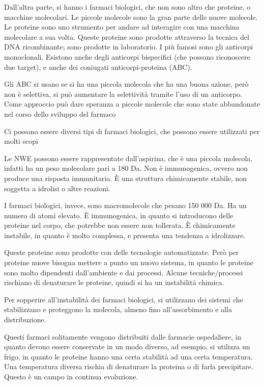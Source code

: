 Dall'altra parte, si hanno i farmaci biologici, che non sono altro che
proteine, o macchine molecolari. Le piccole molecole sono la gran parte
delle nuove molecole. Le proteine sono uno strumento per andare ad
interagire con una macchina molecolare a sua volta.
Queste proteine sono prodotte attraverso la tecnica del DNA
ricombinante; sono prodotte in laboratorio.
I più famosi sono gli anticorpi monoclonali. Esistono anche degli
anticorpi bispecifici (che possono riconoscere due target), e anche dei
coniugati anticorpi-proteina (ABC).

Gli ABC si usano se si ha una piccola molecola che ha una buona azione,
però non è selettiva, si può aumentare la selettività tramite l'uso di
un anticorpo. Come approccio può dare speranza a piccole molecole che
sono state abbandonate nel corso dello sviluppo del farmaco

Ci possono essere diversi tipi di farmaci biologici, che possono essere
utilizzati per molti scopi

Le NWE possono essere rappresentate dall'aspirina, che è una piccola
molecola, infatti ha un peso molecolare pari a 180 Da. Non è immunogenica, ovvero non
produce una risposta immunitaria. È una struttura chimicamente stabile,
non soggetta a idrolisi o altre reazioni.

I farmaci biologici, invece, sono macromolecole che pesano 150 000 Da. Ha
un numero di atomi elevato. È immunogenica, in quanto si introducono
delle proteine nel corpo, che potrebbe non essere non tollerata. È
chimicamente instabile, in quanto è molto complessa, e presenta una
tendenza a idrolizzare.

Queste proteine sono prodotte con delle tecnologie automatizzate. Però
per proteine nuove bisogna mettere a punto un nuovo sistema, in quanto
le proteine sono molto dipendenti dall'ambiente e dai processi. Alcune
tecniche/processi rischiano di denaturare le proteine, quindi si ha un
instabilità chimica.

Per sopperire all'instabilità dei farmaci biologici, si utilizzano dei
sistemi che stabilizzano e proteggono la molecola, almeno fino
all'assorbimento e alla distribuzione.

Questi farmaci solitamente vengono distribuiti dalle farmacie
ospedaliere, in quanto devono essere conservate in un modo diverso, ad
esempio, si utilizza un frigo, in quanto le proteine hanno una certa
stabilità ad una certa temperatura. Una temperatura diversa rischia di
denaturare la proteina o di farla precipitare.
Questo è un campo in continua evoluzione.

